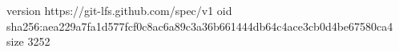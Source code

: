version https://git-lfs.github.com/spec/v1
oid sha256:aea229a7fa1d577fcf0c8ac6a89c3a36b661444db64c4ace3cb0d4be67580ca4
size 3252
